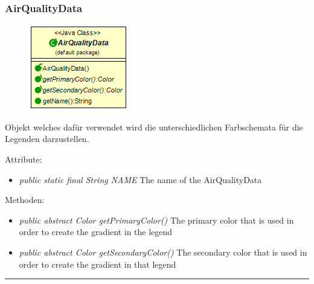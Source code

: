 \subsubsection{AirQualityData}
\begin{minipage}{0.3\textwidth}
    \begin{figure}[H]
        {\centering\includegraphics[scale = 0.6
        ]{media/view/airquality/AirQualityData_Class.png}}
    \end{figure}
    \end{minipage} \hfill
    \begin{minipage}{0.6\textwidth}
Objekt welches dafür verwendet wird die unterschiedlichen Farbschemata für die Legenden darzustellen.
\end{minipage}
Attribute: \begin{itemize} [noitemsep]
     \item \emph{public static final String NAME} The name of the AirQualityData
\end{itemize}
Methoden: \begin{itemize} [noitemsep]
    \item \emph{public abstract Color getPrimaryColor()} The primary color that is used in order to create the gradient in the legend
    \item \emph{public abstract Color getSecondaryColor()} The secondary color that is used in order to create the gradient in that legend
\end{itemize}

\rule{\textwidth}{0.4pt}
